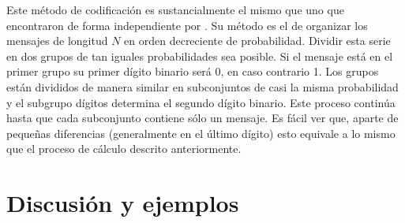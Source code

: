 Este m\'etodo de codificaci\'on es sustancialmente el mismo que uno
que encontraron de forma independiente por \citet{fano}. Su m\'etodo
es el de organizar los mensajes de longitud $N$ en orden decreciente
de probabilidad. Dividir esta serie en dos grupos de tan iguales
probabilidades sea posible. Si el mensaje est\'a en el primer grupo su
primer d\'igito binario ser\'a 0, en caso contrario 1. Los grupos
est\'an divididos de manera similar en subconjuntos de casi la misma
probabilidad y el subgrupo d\'igitos determina el segundo d\'igito
binario. Este proceso contin\'ua hasta que cada subconjunto contiene
s\'olo un mensaje. Es f\'acil ver que, aparte de peque\~{n}as
diferencias (generalmente en el \'ultimo d\'igito) esto equivale a lo
mismo que el proceso de c\'alculo descrito anteriormente.

\chapter{Discusi\'on y ejemplos}

